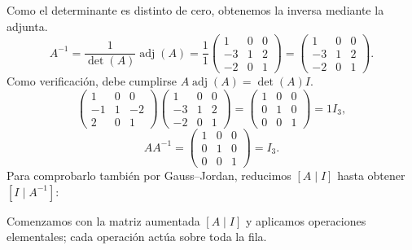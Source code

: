 \documentclass[12pt]{article}
\newcommand{\adj}{\operatorname{adj}}
\begin{document}
Como el determinante es distinto de cero, obtenemos la inversa mediante la adjunta.
\[
A^{-1}=\frac1{\det(A)}\adj(A)=\frac1{1}\begin{pmatrix}1&0&0\\-3&1&2\\-2&0&1\end{pmatrix}=\begin{pmatrix}1&0&0\\-3&1&2\\-2&0&1\end{pmatrix}.
\]
Como verificación, debe cumplirse $A\adj(A)=\det(A)I$.
\[
\begin{pmatrix}1&0&0\\-1&1&-2\\2&0&1\end{pmatrix}\begin{pmatrix}1&0&0\\-3&1&2\\-2&0&1\end{pmatrix}=\begin{pmatrix}1&0&0\\0&1&0\\0&0&1\end{pmatrix}=1I_{3},
\]
\[
AA^{-1}=\begin{pmatrix}1&0&0\\0&1&0\\0&0&1\end{pmatrix}=I_{3}.
\]
Para comprobarlo también por Gauss--Jordan, reducimos $[A\mid I]$ hasta obtener $[I\mid A^{-1}]$:

Comenzamos con la matriz aumentada $[A\mid I]$ y aplicamos operaciones elementales; cada operación actúa sobre toda la fila.
\end{document}
